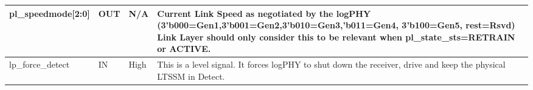 \begin{table}[H]

    \centering
  \begin{tabular}{ |P{26mm}|P{5mm}|P{10mm} | m{60mm}|  }
  \hline
pl\_speedmode[2:0] & OUT & N/A & Current Link Speed as negotiated by the logPHY
(3’b000=Gen1,3’b001=Gen2,3’b010=Gen3,’b011=Gen4, 3’b100=Gen5, rest=Rsvd)
Link Layer should only consider this to be relevant when pl\_state\_sts=RETRAIN or
ACTIVE. \\ \hline
lp\_force\_detect & IN & High & This is a level signal. It forces logPHY to shut down the receiver, drive and keep the
physical LTSSM in Detect. \\ \hline
\end{tabular}
\end{table}


